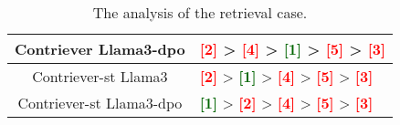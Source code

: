 \begin{table*}[ht]
\begin{tabularx}{\textwidth}{c|X}
        Contriever \textbullet{} Llama3-dpo & \textbf{\textcolor{red}{[2]}} > \textbf{\textcolor{red}{[4]}} > \textbf{\textcolor{darkgreen}{[1]}} > \textbf{\textcolor{red}{[5]}} > \textbf{\textcolor{red}{[3]}} \\ \midrule
        Contriever-st \textbullet{} Llama3 & \textbf{\textcolor{red}{[2]}} > \textbf{\textcolor{darkgreen}{[1]}} > \textbf{\textcolor{red}{[4]}} > \textbf{\textcolor{red}{[5]}} > \textbf{\textcolor{red}{[3]}} \\ \midrule
        Contriever-st \textbullet{} Llama3-dpo & \textbf{\textcolor{darkgreen}{[1]}} > \textbf{\textcolor{red}{[2]}} > \textbf{\textcolor{red}{[4]}} > \textbf{\textcolor{red}{[5]}} > \textbf{\textcolor{red}{[3]}} \\
        \bottomrule
    \end{tabularx}
    \label{case}
    \caption{The analysis of the retrieval case.}
\end{table*}

